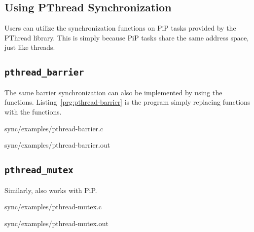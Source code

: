 \subsection{Using PThread Synchronization}

Users can utilize the synchronization functions on PiP tasks provided
by the PThread library. This is simply because PiP tasks share the
same address space, just like threads.

\subsection{\tt pthread_barrier}

The same barrier synchronization can also be implemented by using the
 functions. 
Listing~\ref{prg:pthread-barrier} is the program simply replacing
 functions with the 
functions. 


                {sync/examples/pthread-barrier.c}


                {sync/examples/pthread-barrier.out}
                
\subsection{\tt pthread_mutex}

Similarly,  also works with PiP. 


                {sync/examples/pthread-mutex.c}


                {sync/examples/pthread-mutex.out}
